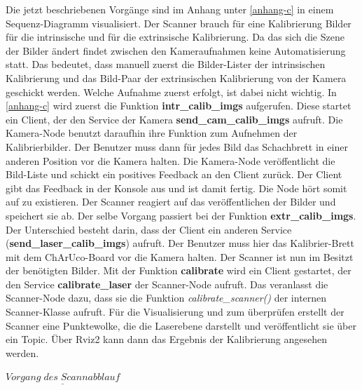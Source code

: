 		Die jetzt beschriebenen Vorgänge sind im Anhang unter \ref{anhang-c} in einem Sequenz-Diagramm visualisiert. \newline
		Der Scanner brauch für eine Kalibrierung Bilder für die intrinsische und für die extrinsische Kalibrierung. Da das sich die Szene der Bilder ändert findet zwischen den Kameraufnahmen keine Automatisierung statt. Das bedeutet, dass manuell zuerst die Bilder-Lister der intrinsischen Kalibrierung und das Bild-Paar der extrinsischen Kalibrierung von der Kamera geschickt werden. Welche Aufnahme zuerst erfolgt, ist dabei nicht wichtig. In \ref{anhang-c} wird zuerst die Funktion \textbf{intr\_calib\_imgs} aufgerufen. Diese startet ein Client, der den Service der Kamera \textbf{send\_cam\_calib\_imgs} aufruft. Die Kamera-Node benutzt daraufhin ihre Funktion zum Aufnehmen der Kalibrierbilder. Der Benutzer muss dann für jedes Bild das Schachbrett in einer anderen Position vor die Kamera halten. Die Kamera-Node veröffentlicht die Bild-Liste und schickt ein positives Feedback an den Client zurück. Der Client gibt das Feedback in der Konsole aus und ist damit fertig. Die Node hört somit auf zu existieren. Der Scanner reagiert auf das veröffentlichen der Bilder und speichert sie ab. \newline
		Der selbe Vorgang passiert bei der Funktion \textbf{extr\_calib\_imgs}. Der Unterschied besteht darin, dass der Client ein anderen Service (\textbf{send\_laser\_calib\_imgs}) aufruft. Der Benutzer muss hier das Kalibrier-Brett mit dem ChArUco-Board vor die Kamera halten. \newline
		Der Scanner ist nun im Besitzt der benötigten Bilder. Mit der Funktion \textbf{calibrate} wird ein Client gestartet, der den Service \textbf{calibrate\_laser} der Scanner-Node aufruft. Das veranlasst die Scanner-Node dazu, dass sie die Funktion \textit{calibrate\_scanner()} der internen Scanner-Klasse aufruft. Für die Visualisierung und zum überprüfen erstellt der Scanner eine Punktewolke, die die Laserebene darstellt und veröffentlicht sie über ein Topic. Über Rviz2 kann dann das Ergebnis der Kalibrierung angesehen werden.
		
		$\underline{Vorgang\;des\;Scannabblauf}$
		
